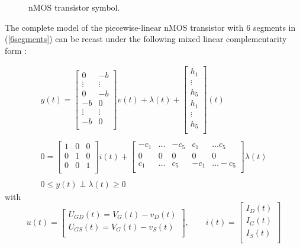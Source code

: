 \documentclass{article}
\def\geq{\geqslant}
\def\leq{\leqslant}
\begin{document}
\begin{figure}
  \centering
  
  \caption{nMOS transistor symbol.}
  \label{fig:NMOS}
\end{figure}

The complete model of the piecewise-linear nMOS transistor with 6 segments in (\ref{6segments}) can be recast under the following mixed linear complementarity form \cite{leenaerts-bokhoven1998}:

\begin{equation}
  \label{eq:68}
  \begin{array}{l}
  y(t) = 
  \left[\begin{array}{cc}
    0 & -b \\
    \vdots & \vdots  \\
     0 & -b \\
      -b &  0 \\
    \vdots & \vdots \\
     -b &  0 \\
  \end{array}\right]
  v(t)
  +
 \lambda(t)
  +
   \left[\begin{array}{c}
    h_1 \\
    \vdots \\
    h_5 \\
      h_1 \\
    \vdots \\
     h_5 \\
  \end{array}\right](t) \\ \\ 
 0 =
  \left[\begin{array}{ccc}
    1 & 0 & 0 \\
    0 & 1 & 0 \\
    0 & 0 & 1 \\
  \end{array}\right]
 i(t) 
 + 
 \left[\begin{array}{cccccc}
   -c_1  &\ldots & -c_5 & c_1 &\ldots c_5 \\
   0  & 0& 0 &0  & 0  \\
   c_1  &\ldots & c_5 & -c_1 &\ldots -c_5 \\
 \end{array}\right]
\lambda(t) \\ \\ 0 \leq y(t) \perp \lambda(t) \geq 0
\end{array}
\end{equation}
  with
\begin{equation}
  \label{eq:69}
  u(t) = 
  \left[\begin{array}{c}
    U_{GD}(t)=V_G(t)-v_D(t) \\
    U_{GS}(t)=V_G(t)-v_S(t) \\ 
  \end{array}\right],\quad\quad
i(t) = 
  \left[\begin{array}{c}
   I_D(t) \\
   I_G(t) \\
   I_S(t) \\
  \end{array}\right]
\end{equation}
\end{document}
